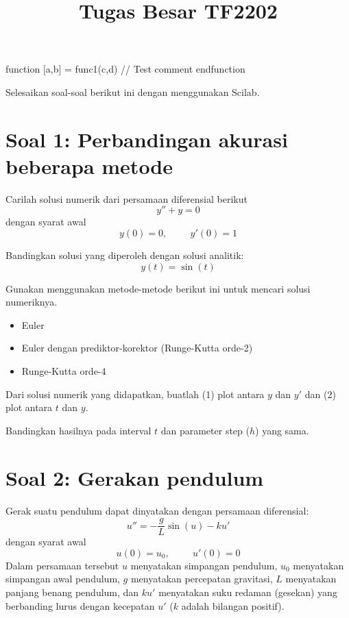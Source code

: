 \documentclass[12pt]{article}
\begin{document}
\title{Tugas Besar TF2202}
\date{}
\maketitle

\begin{scilabcode}
function [a,b] = func1(c,d)
  // Test comment
endfunction
\end{scilabcode}

Selesaikan soal-soal berikut ini dengan menggunakan Scilab.

\section{Soal 1: Perbandingan akurasi beberapa metode}

Carilah solusi numerik dari persamaan diferensial berikut
\begin{equation}
y'' + y = 0
\end{equation}
dengan syarat awal
\begin{equation}
y(0) = 0, \hspace{1cm} y'(0) = 1
\end{equation}

Bandingkan solusi yang diperoleh dengan solusi analitik:
\begin{equation}
y(t) = \sin(t)
\end{equation}

Gunakan menggunakan metode-metode berikut ini untuk mencari solusi numeriknya.
\begin{itemize}
\item Euler
\item Euler dengan prediktor-korektor (Runge-Kutta orde-2)
\item Runge-Kutta orde-4
\end{itemize}

Dari solusi numerik yang didapatkan, buatlah (1) plot antara $y$ dan $y'$
dan (2) plot antara $t$ dan $y$.

Bandingkan hasilnya pada interval $t$ dan parameter step ($h$) yang sama.

\section{Soal 2: Gerakan pendulum}

Gerak suatu pendulum dapat dinyatakan dengan persamaan diferensial:
\begin{equation}
u'' = -\frac{g}{L}\sin(u) - ku'
\end{equation}
dengan syarat awal
\begin{equation}
u(0) = u_0, \hspace{1cm} u'(0) = 0
\end{equation}
Dalam persamaan tersebut $u$ menyatakan simpangan pendulum,
$u_0$ menyatakan simpangan awal pendulum,
$g$ menyatakan percepatan gravitasi, $L$ menyatakan panjang benang pendulum,
dan $ku'$ menyatakan suku redaman (gesekan) yang berbanding lurus
dengan kecepatan $u'$ ($k$ adalah bilangan positif).
\end{document}
